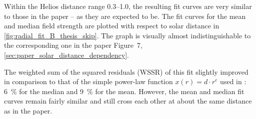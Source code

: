 %
Within the Helios distance range \SIrange{0.3}{1.0}{\au}, the resulting fit curves are very similar to those in the paper -- as they are expected to be. The fit curves for the mean and median field strength are plotted with respect to solar distance in \autoref{fig:radial_fit_B_thesis_skip}. The graph is visually almost indistinguishable to the corresponding one in the paper Figure~7, \autoref{sec:paper_solar_distance_dependency}.
\begin{figure}[b]
\end{figure}

The weighted sum of the squared residuals (WSSR) of this fit slightly improved in comparison to that of the simple power-law function $x(r) = d \cdot r^e$ used in \citet{Venzmer2018}: \SI{6}{\%} for the median and \SI{9}{\%} for the mean. However, the mean and median fit curves remain fairly similar and still cross each other at about the same distance as in the paper.

